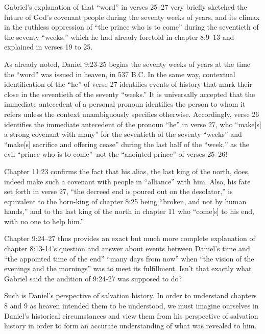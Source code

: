 Gabriel's explanation of that ``word'' in verses 25--27 very briefly sketched
the future of God's covenant people during the seventy weeks of years, and
its climax in the ruthless oppression of ``the prince who is to come'' during
the seventieth of the seventy ``weeks,'' which he had already foretold in
chapter 8:9--13 and explained in verses 19 to 
25.

As already noted, Daniel 9:23-25 begins the seventy weeks of years at the
time the ``word'' was issued in heaven, in 537 B.C. In the same way,
contextual identification of the ``he'' of verse 27 identifies events of
history that mark their close in the seventieth of the seventy ``weeks.'' It
is universally accepted that the immediate antecedent of a personal pronoun
identifies the person to whom it refers unless the context unambiguously
specifies otherwise. Accordingly, verse 26 identifies the immediate
antecedent of the pronoun ``he'' in verse 27, who ``make[s] a strong covenant
with many'' for the seventieth of the seventy ``weeks'' and ``make[s] sacrifice
and offering cease'' during the last half of the ``week,'' as the evil ``prince
who is to come''--not the ``anointed prince'' of verses 25--26! 

Chapter 11:23 confirms the fact that his alias, the last king of the north,
does, indeed make such a covenant with people in ``alliance'' with him. Also,
his fate set forth in verse 27, ``the decreed end is poured out on the
desolator,'' is equivalent to the horn-king of chapter 8:25 being ``broken,
and not by human hands,'' and to the last king of the north in chapter 11 who
``come[s] to his end, with no one to help him.'' 

Chapter 9:24--27 thus provides an exact but much more complete explanation of
chapter 8:13-14's question and answer about events between Daniel's time and
``the appointed time of the end'' ``many days from now'' when ``the vision of the
evenings and the mornings'' was to meet its 
fulfillment. Isn't that exactly
what Gabriel said the audition of 9:24-27 was supposed to 
do? 

Such is Daniel's perspective of salvation history. In order to understand
chapters 8 and 9 as heaven intended them to be understood, we must imagine
ourselves in Daniel's historical circumstances and view them from his
perspective of salvation history in order to form an accurate understanding
of what was revealed to him.

